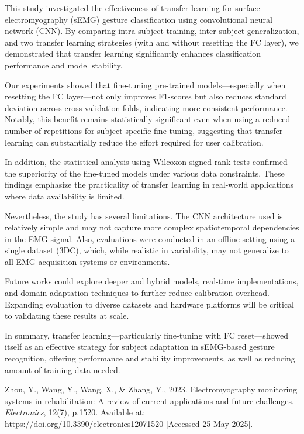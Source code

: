 \begin{multicols}{2}
This study investigated the effectiveness of transfer learning for surface electromyography (sEMG) gesture classification using convolutional neural network (CNN). By comparing intra-subject training, inter-subject generalization, and two transfer learning strategies (with and without resetting the FC layer), we demonstrated that transfer learning significantly enhances classification performance and model stability.

Our experiments showed that fine-tuning pre-trained models—especially when resetting the FC layer—not only improves F1-scores but also reduces standard deviation across cross-validation folds, indicating more consistent performance. Notably, this benefit remains statistically significant even when using a reduced number of repetitions for subject-specific fine-tuning, suggesting that transfer learning can substantially reduce the effort required for user calibration.

In addition, the statistical analysis using Wilcoxon signed-rank tests confirmed the superiority of the fine-tuned models under various data constraints. These findings emphasize the practicality of transfer learning in real-world applications where data availability is limited.

Nevertheless, the study has several limitations. The CNN architecture used is relatively simple and may not capture more complex spatiotemporal dependencies in the EMG signal. Also, evaluations were conducted in an offline setting using a single dataset (3DC), which, while realistic in variability, may not generalize to all EMG acquisition systems or environments.

Future works could explore deeper and hybrid models, real-time implementations, and domain adaptation techniques to further reduce calibration overhead. Expanding evaluation to diverse datasets and hardware platforms will be critical to validating these results at scale.

In summary, transfer learning—particularly fine-tuning with FC reset—showed itself as an effective strategy for subject adaptation in sEMG-based gesture recognition, offering performance and stability improvements, as well as reducing amount of training data needed.

\renewcommand{\refname}{References}

\begin{thebibliography}{99}\footnotesize 

Zhou, Y., Wang, Y., Wang, X., \& Zhang, Y., 2023. Electromyography monitoring systems in rehabilitation: A review of current applications and future challenges. \textit{Electronics}, 12(7), p.1520. Available at: \url{https://doi.org/10.3390/electronics12071520} [Accessed 25 May 2025].


\end{thebibliography}
\end{multicols}
